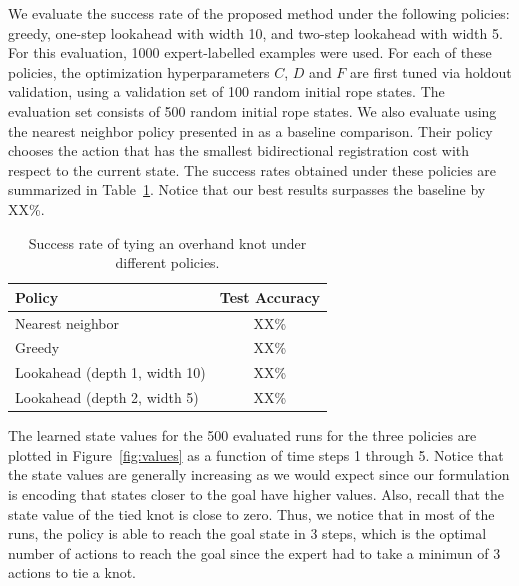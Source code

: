 We evaluate the success rate of the proposed method under the following policies: greedy, one-step lookahead with width 10, and two-step lookahead with width 5.
For this evaluation, 1000 expert-labelled examples were used.
For each of these policies, the optimization hyperparameters $C$, $D$ and $F$ are first tuned via holdout validation, using a validation set of 100 random initial rope states.
The evaluation set consists of 500 random initial rope states.
We also evaluate using the nearest neighbor policy presented in \citet{Schulmanetal_ISRR2013} as a baseline comparison.
Their policy chooses the action that has the smallest bidirectional registration cost with respect to the current state.
The success rates obtained under these policies are summarized in Table~\ref{table:performance}. Notice that our best results surpasses the baseline by XX\%.

\begin{table}
  \centering
  \begin{tabular}{lc}
    \toprule
      Policy & Test Accuracy\\
    \midrule
      Nearest neighbor \cite{Schulmanetal_ISRR2013} & XX\% \\
    \midrule
      Greedy & XX\% \\
      Lookahead (depth 1, width 10) & XX\% \\
      Lookahead (depth 2, width 5) & XX\% \\
    \bottomrule
  \end{tabular}
  \caption{Success rate of tying an overhand knot under different policies.}
  \label{table:performance}
\end{table}

The learned state values for the 500 evaluated runs for the three policies are plotted in Figure~\ref{fig:values} as a function of time steps 1 through 5.
Notice that the state values are generally increasing as we would expect since our formulation is encoding that states closer to the goal have higher values.
Also, recall that the state value of the tied knot is close to zero. 
Thus, we notice that in most of the runs, the policy is able to reach the goal state in 3 steps, which is the optimal number of actions to reach the goal since the expert had to take a minimun of 3 actions to tie a knot.

